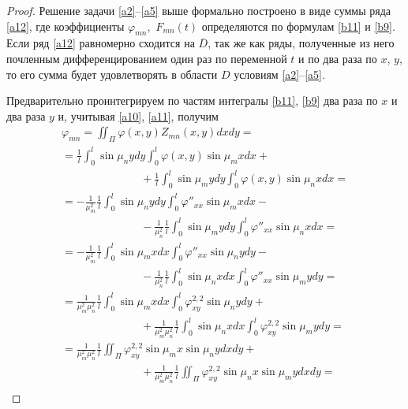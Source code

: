 \begin{proof}
Решение задачи \eqref{a2}--\eqref{a5} выше формально построено в виде суммы ряда \eqref{a12}, где коэффициенты $\varphi_{mn},$ 
$ F_{mn}(t)$ определяются по формулам \eqref{b11} и \eqref{b9}. 
Если ряд \eqref{a12} равномерно сходится на $\overline{D}$, так же как ряды, полученные из него почленным дифференцированием один раз по переменной $t$  и по два раза по $x$, $y$, то его сумма будет удовлетворять в области $D$ условиям \eqref{a2}--\eqref{a5}.

Предварительно проинтегрируем по частям интегралы \eqref{b11}, \eqref{b9} два раза по $x$  и два раза $y$ и, учитывая \eqref{a10}, \eqref{a11}, получим
\begin{multline}
\label{a15}
\varphi_{mn}=\iint_\Pi \varphi(x,y)Z_{mn}(x,y)dxdy= 
\\
=
\frac{1}{l}\int_0^l\sin\mu_nydy\int_0^l\varphi(x,y)\sin\mu_mxdx+ \hspace{3cm}
\\
\hspace{3cm}
+\frac{1}{l}\int_0^l\sin\mu_mydy\int_0^l\varphi(x,y)\sin\mu_nxdx=
\\
=
-\frac{1}{\mu_m^2}\frac{1}{l}\int_0^l\sin\mu_nydy\int_0^l\varphi''_{xx}\sin\mu_mxdx-
\hspace{3cm}
\\
\hspace{3cm}
-\frac{1}{\mu_n^2}\frac{1}{l}\int_0^l\sin\mu_mydy\int_0^l\varphi''_{xx}\sin\mu_nxdx=
\\
= -\frac{1}{\mu_m^2}\frac{1}{l}\int_0^l\sin\mu_mxdx\int_0^l\varphi''_{xx}\sin\mu_nydy-
\hspace{3cm}
\\
\hspace{3cm}
-\frac{1}{\mu_n^2}\frac{1}{l}\int_0^l\sin\mu_nxdx\int_0^l\varphi''_{xx}\sin\mu_mydy=
\\
=
\frac{1}{\mu_m^2\mu_n^2}\frac{1}{l}\int_0^l\sin\mu_mxdx\int_0^l\varphi^{2,2}_{xy}\sin\mu_nydy
+\hspace{3cm}
\\
\hspace{3cm}
+\frac{1}{\mu_m^2\mu_n^2}\frac{1}{l}\int_0^l\sin\mu_nxdx\int_0^l\varphi^{2,2}_{xy}\sin\mu_mydy
=
\\
=
\frac{1}{\mu_m^2\mu_n^2}\frac{1}{l}\iint_\Pi \varphi^{2,2}_{xy}\sin\mu_mx\sin\mu_nydxdy+
\hspace{3cm}
\\
\hspace{3cm}
+\frac{1}{\mu_m^2\mu_n^2}\frac{1}{l}\iint_\Pi \varphi^{2,2}_{xy}\sin\mu_nx\sin\mu_mydxdy=\\

\end{multline}
\end{proof}
